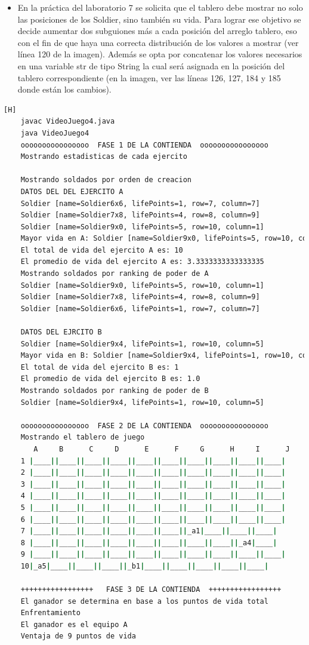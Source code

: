 \documentclass{article}
\begin{document}
	\begin{itemize}	
		\item En la práctica del laboratorio 7 se solicita que el tablero debe mostrar no solo las posiciones de los Soldier, sino también su vida. Para lograr ese objetivo se decide aumentar dos subguiones más a cada posición del arreglo tablero, eso con el fin de que haya una correcta distribución de los valores a mostrar (ver línea 120 de la imagen). Además se opta por concatenar los valores necesarios en una variable str de tipo String la cual será asignada en la posición del tablero correspondiente (en la imagen, ver las líneas 126, 127, 184 y 185 donde están los cambios).
	\end{itemize}
		
	\begin{lstlisting}[language=bash,caption={Compilando y probando el tablero  }][H]
	javac VideoJuego4.java
	java VideoJuego4
	oooooooooooooooo  FASE 1 DE LA CONTIENDA  oooooooooooooooo
	Mostrando estadisticas de cada ejercito
	
	Mostrando soldados por orden de creacion
	DATOS DEL DEL EJERCITO A
	Soldier [name=Soldier6x6, lifePoints=1, row=7, column=7]
	Soldier [name=Soldier7x8, lifePoints=4, row=8, column=9]
	Soldier [name=Soldier9x0, lifePoints=5, row=10, column=1]
	Mayor vida en A: Soldier [name=Soldier9x0, lifePoints=5, row=10, column=1]
	El total de vida del ejercito A es: 10
	El promedio de vida del ejercito A es: 3.3333333333333335
	Mostrando soldados por ranking de poder de A
	Soldier [name=Soldier9x0, lifePoints=5, row=10, column=1]
	Soldier [name=Soldier7x8, lifePoints=4, row=8, column=9]
	Soldier [name=Soldier6x6, lifePoints=1, row=7, column=7]
	
	DATOS DEL EJRCITO B
	Soldier [name=Soldier9x4, lifePoints=1, row=10, column=5]
	Mayor vida en B: Soldier [name=Soldier9x4, lifePoints=1, row=10, column=5]
	El total de vida del ejercito B es: 1
	El promedio de vida del ejercito B es: 1.0
	Mostrando soldados por ranking de poder de B
	Soldier [name=Soldier9x4, lifePoints=1, row=10, column=5]
	
	oooooooooooooooo  FASE 2 DE LA CONTIENDA  oooooooooooooooo
	Mostrando el tablero de juego
	   A     B      C     D      E      F     G      H     I      J
	1 |____||____||____||____||____||____||____||____||____||____|
	2 |____||____||____||____||____||____||____||____||____||____|
	3 |____||____||____||____||____||____||____||____||____||____|
	4 |____||____||____||____||____||____||____||____||____||____|
	5 |____||____||____||____||____||____||____||____||____||____|
	6 |____||____||____||____||____||____||____||____||____||____|
	7 |____||____||____||____||____||____||_a1|____||____||____|
	8 |____||____||____||____||____||____||____||____||_a4|____|
	9 |____||____||____||____||____||____||____||____||____||____|
	10|_a5|____||____||____||_b1|____||____||____||____||____|
	
	+++++++++++++++++   FASE 3 DE LA CONTIENDA  +++++++++++++++++
	El ganador se determina en base a los puntos de vida total
	Enfrentamiento
	El ganador es el equipo A
	Ventaja de 9 puntos de vida
	\end{lstlisting}
	
\end{document}
